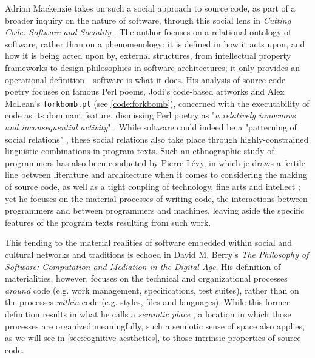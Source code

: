 Adrian Mackenzie takes on such a social approach to source code, as part of a broader inquiry on the nature of software, through this social lens in \emph{Cutting Code: Software and Sociality} \citep{mackenzie_cutting_2006}. The author focuses on a relational ontology of software, rather than on a phenomenology: it is defined in how it acts upon, and how it is being acted upon by, external structures, from intellectual property frameworks to design philosophies in software architectures; it only provides an operational definition—software is what it does. His analysis of source code poetry focuses on famous Perl poems, Jodi's code-based artworks and Alex McLean's \lstinline{forkbomb.pl} (see \autoref{code:forkbomb}), concerned with the executability of code as its dominant feature, dismissing Perl poetry as "\emph{a relatively innocuous and inconsequential activity}" \citep{mackenzie_cutting_2006}. While software could indeed be a "patterning of social relations" \citep{mackenzie_cutting_2006}, these social relations also take place through highly-constrained linguistic combinations in program texts. Such an ethnographic study of programmers has also been conducted by Pierre Lévy, in which je draws a fertile line between literature and architecture when it comes to considering the making of source code, as well as a tight coupling of technology, fine arts and intellect \citep{levy_programmation_1992}; yet he focuses on the material processes of writing code, the interactions between programmers and between programmers and machines, leaving aside the specific features of the program texts resulting from such work.

This tending to the material realities of software embedded within social and cultural networks and traditions is echoed in David M. Berry's \emph{The Philosophy of Software: Computation and Mediation in the Digital Age}. His definition of materialities, however, focuses on the technical and organizational processes \emph{around} code (e.g. work management, specifications, test suites), rather than on the processes \emph{within} code (e.g. styles, files and languages). While this former definition results in what he calls a \emph{semiotic place} \citep{berry_philosophy_2011}, a location in which those processes are organized meaningfully, such a semiotic sense of space also applies, as we will see in \autoref{sec:cognitive-aesthetics}, to those intrinsic properties of source code.

